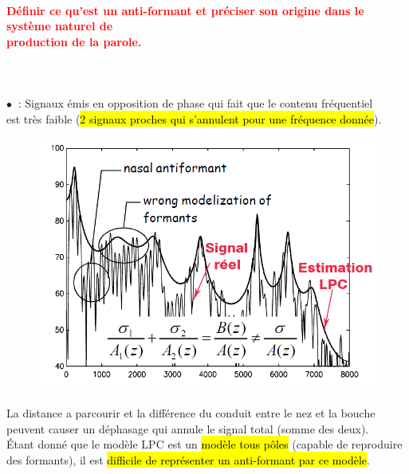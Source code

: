 \documentclass[letterpaper, 12pt]{article}
\newcommand{\alinea}{
\hspace*{0.3cm}}
\newcommand{\red}[1]{
	\textcolor{red}{#1}
}
\newcommand{\myul}[1]{
	\underline{\smash{#1}}
}
\newcommand{\point}{$\bullet\ $}
\begin{document}
		\paragraph{\red{Définir ce qu'est un anti-formant et préciser son origine dans le système naturel de 
		~\\ \hspace*{0.035cm} production de la parole.}}~\\~\\
			\point \myul{Anti-formant} : Signaux émis en opposition de phase qui fait que le contenu fréquentiel
				\\\alinea est très faible (\hl{2 signaux proches qui s'annulent pour une fr\'equence donn\'ee}).\\
			\begin{minipage}{0.45\textwidth}
				\begin{figure}[H]
				\centering
				\includegraphics[scale=0.6]{Images/antiformants}
			\end{figure}\noindent
			\end{minipage}\hfill
			\begin{minipage}{0.45\textwidth}
				\alinea La distance a parcourir et la différence du conduit entre le nez et la bouche peuvent
					causer un déphasage qui annule le signal total (somme des deux).				
				\\
				\alinea \'Etant donné que le modèle LPC est un \hl{mod\`ele tous p\^oles} (capable de reproduire des
					formants), il est \hl{difficile de repr\'esenter un anti-formant par ce mod\`ele}.
			\end{minipage}
		
\end{document}
